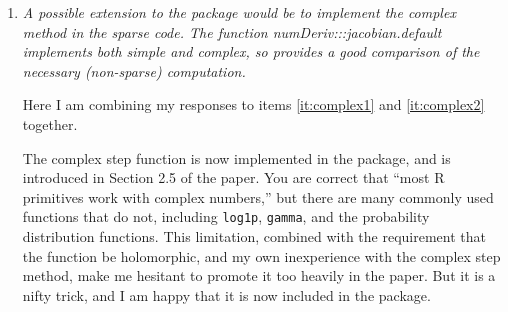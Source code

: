 \documentclass{article}
\newcommand{\code}[1]{\texttt{#1}}
\newcommand{\func}[1]{\code{#1}}
\newenvironment{revQuote}{\itshape}{\vspace{\baselineskip}}
\newenvironment{response}{\normalfont}{\vspace{\baselineskip}}
\begin{document}
\begin{enumerate}[align=left]
\begin{revQuote}
(Code removed)

This is still doing the calculation intensive Richardson approximation. The
calculation which would seem to most closely resemble what is done by
obj\$hessian() is

(Code removed)


Another very interesting comparison is

(Code removed)

The complex step derivative provides extremely accurate approximations with
a  number of function evaluation similar to the simple method. (This does
not seem to be anticipated by footnote 1 in the paper.) However, the method
imposes some serious requirements on the function. (Something like complex
analytic even though the user may only be interested in the real part.) The
code also has to accept complex arguments and return the complex result.
Fortunately most R primitive work with complex numbers so the code
requirement may happen accidentally, which can be partly verified by

binary.grad(P + 0+1i, data=binary, priors=priors, order.row=order.row)

returning a complex result. (This does not rule out all possible problems.)

As I recall, sums, multiplication, and exponentiation are all complex
analytic, so it would not be too surprising if the example in the paper is
too, but I have not analyzed that. However, based on the result being very
good, it seems highly likely.
  \end{revQuote}

  \begin{response}
    See response to Item \ref{it:complex2}
  \end{response}


\item\label{it:complex2} \begin{revQuote}
A possible extension to the package would be to implement the complex
method in the sparse code. The function numDeriv:::jacobian.default
implements both simple and complex, so provides a good comparison of the
necessary (non-sparse) computation. 

  \end{revQuote}

\begin{response}

Here I am combining my responses to items \ref{it:complex1} and
\ref{it:complex2} together.

  The complex step function is now implemented in the package, and is
  introduced in Section 2.5 of the paper.  You
  are correct that ``most R primitives work with complex numbers,''
  but there are many commonly used functions that do not, including 
  \func{log1p}, \func{gamma}, and the probability distribution
  functions. This limitation, combined with the requirement that the function be
  holomorphic, and my own inexperience with the complex step method, make
  me hesitant to promote it too heavily in the paper. But it is a nifty
  trick, and I am happy that it is now included in the package.
 

\end{response}
\end{enumerate}
\end{document}
